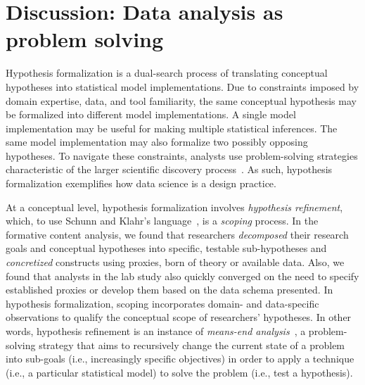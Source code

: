 \vspace{-2mm}
\section{Discussion: Data analysis as problem solving}
Hypothesis formalization is a dual-search process of translating conceptual
hypotheses into statistical model implementations. Due to constraints imposed by
domain expertise, data, and tool familiarity, the same conceptual hypothesis may
be formalized into different model implementations. A single model implementation may be useful for making multiple statistical inferences. The same model
implementation may also formalize two possibly opposing hypotheses. To navigate
these constraints, analysts use problem-solving strategies characteristic of the
larger scientific discovery process~\cite{klahr1988dual,schunn1995FourSpace}. As
such, hypothesis formalization exemplifies how data science is a design
practice. 
 
At a conceptual level, hypothesis formalization involves \textit{hypothesis
refinement}, which, to use Schunn and Klahr's
language~\cite{schunn1995FourSpace}, is a \textit{scoping} process. In the
formative content analysis, we found that researchers \textit{decomposed} their
research goals and conceptual hypotheses into specific, testable sub-hypotheses
and \textit{concretized} constructs using proxies, born of theory or available
data. Also, we found that analysts in the lab study also quickly converged on
the need to specify established proxies or develop them based on the data schema
presented. In hypothesis formalization, scoping incorporates domain- and
data-specific observations to qualify the conceptual scope of researchers'
hypotheses. In other words, hypothesis refinement is an instance of
\textit{means-end analysis}~\cite{newell1972humanProblemSolving}, a
problem-solving strategy that aims to recursively change the current state of a
problem into sub-goals (i.e., increasingly specific objectives) in order to
apply a technique (i.e., a particular statistical model) to solve the problem
(i.e., test a hypothesis). 

